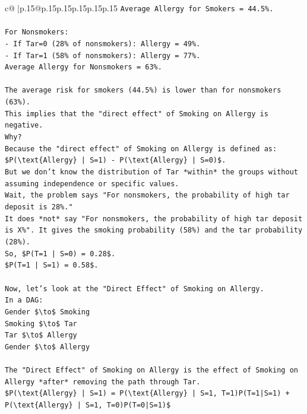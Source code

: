 \documentclass{article}
\begin{document}
{\begin{supertabular}{c@{$\;$}|p{.15\linewidth}@{}p{.15\linewidth}p{.15\linewidth}p{.15\linewidth}p{.15\linewidth}p{.15\linewidth}}
{{{\texttt{Average Allergy for Smokers = 44.5\%.} \\
\\ 
\texttt{For Nonsmokers:} \\
\texttt{{-} If Tar=0 (28\% of nonsmokers): Allergy = 49\%.} \\
\texttt{{-} If Tar=1 (58\% of nonsmokers): Allergy = 77\%.} \\
\texttt{Average Allergy for Nonsmokers = 63\%.} \\
\\ 
\texttt{The average risk for smokers (44.5\%) is lower than for nonsmokers (63\%).} \\
\texttt{This implies that the "direct effect" of Smoking on Allergy is negative.} \\
\texttt{Why?} \\
\texttt{Because the "direct effect" of Smoking on Allergy is defined as:} \\
\texttt{\$P(\textbackslash{}text\{Allergy\} | S=1) {-} P(\textbackslash{}text\{Allergy\} | S=0)\$.} \\
\texttt{But we don't know the distribution of Tar *within* the groups without assuming independence or specific values.} \\
\texttt{Wait, the problem says "For nonsmokers, the probability of high tar deposit is 28\%."} \\
\texttt{It does *not* say "For nonsmokers, the probability of high tar deposit is X\%". It gives the smoking probability (58\%) and the tar probability (28\%).} \\
\texttt{So, \$P(T=1 | S=0) = 0.28\$.} \\
\texttt{\$P(T=1 | S=1) = 0.58\$.} \\
\\ 
\texttt{Now, let's look at the "Direct Effect" of Smoking on Allergy.} \\
\texttt{In a DAG:} \\
\texttt{Gender \$\textbackslash{}to\$ Smoking} \\
\texttt{Smoking \$\textbackslash{}to\$ Tar} \\
\texttt{Tar \$\textbackslash{}to\$ Allergy} \\
\texttt{Gender \$\textbackslash{}to\$ Allergy} \\
\\ 
\texttt{The "Direct Effect" of Smoking on Allergy is the effect of Smoking on Allergy *after* removing the path through Tar.} \\
\texttt{\$P(\textbackslash{}text\{Allergy\} | S=1) = P(\textbackslash{}text\{Allergy\} | S=1, T=1)P(T=1|S=1) + P(\textbackslash{}text\{Allergy\} | S=1, T=0)P(T=0|S=1)\$} \\
}}}
\end{supertabular}}
\end{document}
